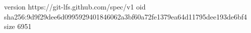 version https://git-lfs.github.com/spec/v1
oid sha256:9d9f29dee6d0995929401846062a3bf60a72fe1379ea64d11795dee193de6bf4
size 6951

